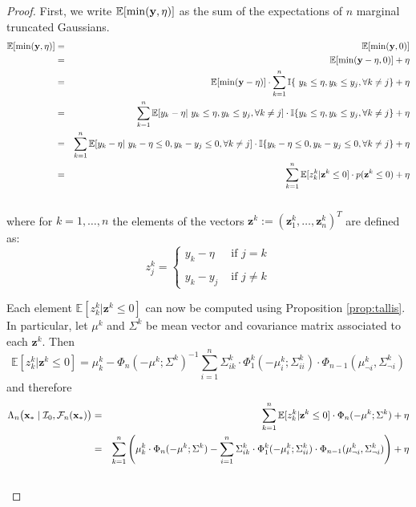 \documentclass{article} %
\newcommand{\I}{\mathcal{I}}
\newcommand{\E}{\mathbb{E}}
\newcommand{\future}{\mathcal{F}}
\newcommand{\ind}{\mathbb{I}}
\newcommand{\bz}{\textbf{z}}
\newtheorem{proof}{Proof}
\begin{document}
\begin{proof}
First, we write $\E [\min (\dataVector,\eta)]$ as the sum of the expectations of $n$ marginal truncated Gaussians. 
\begin{eqnarray}\label{eq:expected_loss_oracle} \nonumber
\E [\min (\dataVector,\eta)] & = & \E [\min (\dataVector,0)] \\  \nonumber
 & = & \E [\min (\dataVector-\eta,0)] +\eta\\  \nonumber
 & = & \E [\min (\dataVector-\eta)] \cdot \sum_{k=1}^n\ind\{\ y_k\leq \eta,  y_k\leq y_j, \forall k\neq j  \} +  \eta\\  \nonumber
 & = & \sum_{k=1}^n\E [y_k-\eta|\ y_k\leq \eta,  y_k\leq y_j, \forall k\neq j ] \cdot \ind\{y_k\leq \eta,  y_k\leq y_j, \forall k\neq j  \} +  \eta\\  \nonumber
 &  = & \sum_{k=1}^n\E [y_k-\eta|\ y_k - \eta \leq 0 ,  y_k - y_j\leq 0 , \forall k\neq j ] \cdot \ind\{y_k - \eta \leq 0 ,  y_k - y_j\leq 0, \forall k\neq j  \} +  \eta\\ 
 &  = & \sum_{k=1}^n\E [ z^k_k|\bz^k \leq 0] \cdot p(\bz^k \leq 0) +  \eta\\ 
   \nonumber
\end{eqnarray}
where for $k=1,\dots,n$ the elements of the vectors $\bz^k:= (\bz^k_1,\dots,\bz^k_n)^T$ are defined as:
$$z_j^k= \left\{ \begin{array}{lcl}
y_k - \eta & \mbox{ if } j=k \\
  \\
y_k - y_j  &   \mbox{ if } j \neq k
\end{array}
\right.$$

Each element $\E [ z^k_k|\bz^k \leq 0]$ can now be computed using Proposition \ref{prop:tallis}. In particular, let $\mu^k$ and $\Sigma^k$ be mean vector and covariance matrix associated to each $\bz^k$. Then 
$$\E [ z^k_k|\bz^k \leq 0]  = \mu^k_k -  \Phi_n ( -\mu^k; \Sigma^k)^{-1} \sum_{i=1}^n \Sigma^k_{ik} \cdot \Phi^k_1(-\mu^k_i;\Sigma^k_{ii}) \cdot \Phi_{n-1}(\mu^k_{\neg i}, \Sigma^k_{\neg i}) $$
and therefore
\begin{eqnarray}\nonumber
\Lambda_n \bigl(\latentVector_* \mid \I_0, \future_{n}(\latentVector_*) \bigr) & = &   \sum_{k=1}^n\E [ z^k_k|\bz^k \leq 0] \cdot \Phi_n ( -\mu^k; \Sigma^k) +  \eta\\  \nonumber
& = &\sum_{k=1}^n \left(  \mu^k_k \cdot \Phi_n ( -\mu^k; \Sigma^k) -  \sum_{i=1}^n \Sigma^k_{ik} \cdot \Phi^k_1(-\mu^k_i;\Sigma^k_{ii}) \cdot \Phi_{n-1}(\mu^k_{\neg i}, \Sigma^k_{\neg i}) \right) + \eta \\ \nonumber
\end{eqnarray}


\end{proof}
\end{document}
